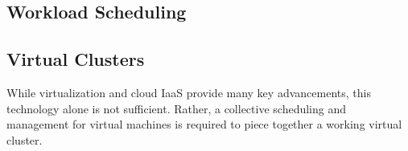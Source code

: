 






\subsection{Workload Scheduling}


\subsection{Virtual Clusters}

While virtualization and cloud IaaS provide many key advancements, this technology alone is not sufficient.  Rather, a collective scheduling and management for virtual machines is required to piece together a working virtual cluster.  

